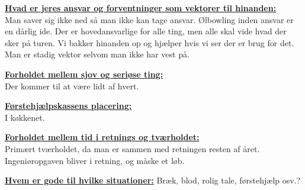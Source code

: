 \underline{\textbf{Hvad er jeres ansvar og forventninger som vektorer til hinanden:}}\\
Man saver sig ikke ned så man ikke kan tage ansvar. Ølbowling inden ansvar er en dårlig ide. Der er hovedansvarlige for alle ting, men alle skal vide hvad der sker på turen. Vi bakker hinanden op og hjælper hvis vi ser der er brug for det. Man er stadig vektor selvom man ikke har vest på.  

\underline{\textbf{Forholdet mellem sjov og seriøse ting:}}\\
Der kommer til at være lidt af hvert. 

\underline{\textbf{Førstehjælpskassens placering:}}\\
I køkkenet.

\underline{\textbf{Forholdet mellem tid i retnings og tværholdet:}}\\
Primært tværholdet, da man er sammen med retningen resten af året. Ingeniøropgaven bliver i retning, og måske et løb. 


\underline{\textbf{Hvem er gode til hvilke situationer:}} Bræk, blod, rolig tale, førstehjælp osv.?\\

